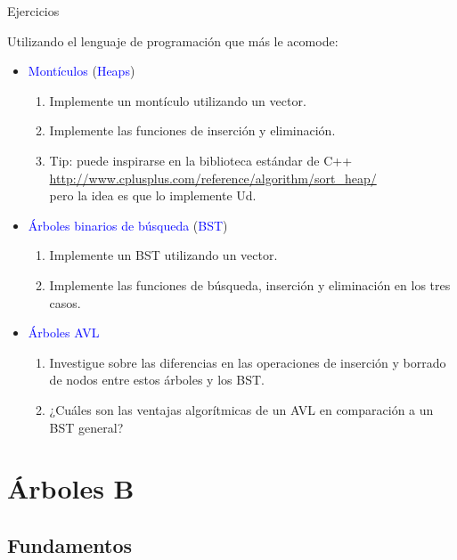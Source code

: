 \documentclass[handout]{beamer} %
\newcommand{\blue}[1]{\textcolor{blue}{#1}}
\begin{document}
\begin{frame}{Ejercicios}

Utilizando el lenguaje de programación que más le acomode:
    \begin{itemize}
        \item \blue{Montículos} (\blue{Heaps})
        \begin{enumerate}
            \item Implemente un montículo utilizando un vector.
            \item Implemente las funciones de inserción y eliminación.
            \item Tip: puede inspirarse en la biblioteca estándar de C++\\
            \blue{\scriptsize\url{http://www.cplusplus.com/reference/algorithm/sort_heap/}}\\
            pero la idea es que lo implemente Ud.
        \end{enumerate}
        \item \blue{Árboles binarios de búsqueda} (\blue{BST})
        \begin{enumerate}
            \item Implemente un BST utilizando un vector.
            \item Implemente las funciones de búsqueda, inserción y eliminación en los tres casos.
        \end{enumerate}
        \item \blue{Árboles AVL}
        \begin{enumerate}
            \item Investigue sobre las diferencias en las operaciones de inserción y borrado de nodos entre estos árboles y los BST.
            \item ¿Cuáles son las ventajas algorítmicas de un AVL en comparación a un BST general?
        \end{enumerate}
    \end{itemize}
\end{frame}

\section{Árboles B}

\subsection{Fundamentos}
\end{document}
